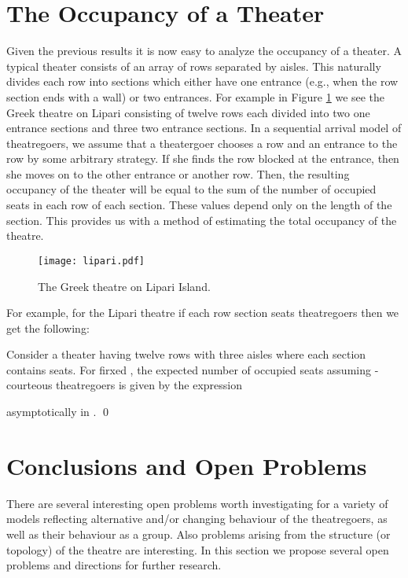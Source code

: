 \documentclass[11pt]{llncs}
\begin{document}
\section{The Occupancy of a Theater}
\label{theater:sec}

Given the previous results it is now easy to analyze the occupancy of a theater.
A typical theater consists of an array of rows separated by aisles.
This
naturally divides each row into sections which either have one entrance (e.g.,
when the row section ends with a wall) or two entrances. 
For example
in Figure \ref{lipari-fig} we see the Greek theatre on Lipari consisting of twelve
rows each divided into two one entrance sections and three two entrance sections.
In a sequential arrival model of
theatregoers, we assume that a theatergoer chooses a row and an entrance to the row by some arbitrary strategy. If she finds the row blocked at the entrance, then she moves on to the other entrance or another row. Then, the resulting occupancy of the theater will be equal to the sum of the number of occupied seats in each row of each
section. 
These values depend only on the length of the section. This
provides us with a method of estimating the total occupancy of the theatre. 



\begin{figure}[!h]
\begin{center}
\texttt{[image: lipari.pdf]}\end{center}
\caption{The Greek theatre on Lipari Island.}
\label{lipari-fig}
\end{figure}

For example, for the Lipari theatre if each row section seats  theatregoers then
we get the following:
\begin{corollary}
Consider a
theater having twelve rows with three aisles where each 
section contains  seats. For firxed , the
expected number of occupied seats
assuming -courteous
theatregoers is given by the expression

asymptotically in .
\qed
\end{corollary}

\section{Conclusions and Open Problems}
\label{other:sec}

There are several interesting open problems worth investigating
for a variety of models reflecting alternative and/or changing 
behaviour of the
theatregoers, as well as their behaviour as a group.
Also problems arising from
the structure (or topology) of the theatre are interesting.
In this section we 
propose several open problems and directions for further research.
 
\end{document}
